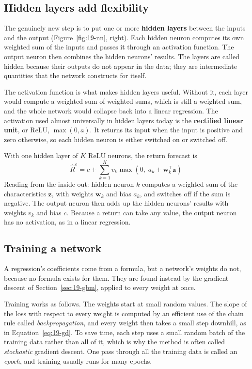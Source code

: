 \subsection{Hidden layers add flexibility}

The genuinely new step is to put one or more \textbf{hidden layers} between the inputs and the output (Figure~\ref{fig:19-nn}, right). Each hidden neuron computes its own weighted sum of the inputs and passes it through an activation function. The output neuron then combines the hidden neurons' results. The layers are called hidden because their outputs do not appear in the data; they are intermediate quantities that the network constructs for itself.

The activation function is what makes hidden layers useful. Without it, each layer would compute a weighted sum of weighted sums, which is still a weighted sum, and the whole network would collapse back into a linear regression. The activation used almost universally in hidden layers today is the \textbf{rectified linear unit}, or ReLU, $\max(0, a)$. It returns its input when the input is positive and zero otherwise, so each hidden neuron is either switched on or switched off.

With one hidden layer of $K$ ReLU neurons, the return forecast is
\begin{equation}
  \hat{R}^{e} = c + \sum_{k=1}^{K} v_k \max\!\left(0,\; a_k + \mathbf{w}_k^{\top}\mathbf{z}\right)
  \label{eq:19-nn}
\end{equation}
Reading from the inside out: hidden neuron $k$ computes a weighted sum of the characteristics $\mathbf{z}$, with weights $\mathbf{w}_k$ and bias $a_k$, and switches off if the sum is negative. The output neuron then adds up the hidden neurons' results with weights $v_k$ and bias $c$. Because a return can take any value, the output neuron has no activation, as in a linear regression.


\subsection{Training a network}

A regression's coefficients come from a formula, but a network's weights do not, because no formula exists for them. They are found instead by the gradient descent of Section~\ref{sec:19-gbm}, applied to every weight at once.

Training works as follows. The weights start at small random values. The slope of the loss with respect to every weight is computed by an efficient use of the chain rule called \emph{backpropagation}, and every weight then takes a small step downhill, as in Equation~\eqref{eq:19-gd}. To save time, each step uses a small random batch of the training data rather than all of it, which is why the method is often called \emph{stochastic} gradient descent. One pass through all the training data is called an \emph{epoch}, and training usually runs for many epochs.



